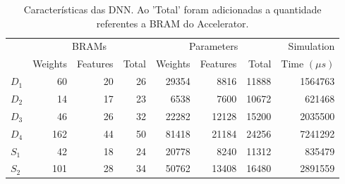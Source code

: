 \begin{table}[ht!]
\centering
\caption{Características das DNN. Ao 'Total' foram adicionadas a quantidade referentes a BRAM do Accelerator.}
\label{tab:5-dnn-report}
\begin{tabular}{lrrrrrrr}
\toprule
 & \multicolumn{3}{c}{BRAMs} & \multicolumn{3}{c}{Parameters} & Simulation \\
\cmidrule(r){2-4} \cmidrule(lr){5-7} \cmidrule(l){8-8}
 & Weights & Features & Total & Weights & Features & Total & Time $(\mu s)$ \\
\midrule
$D_1$ & 60 & 20 & 26 & 29354 & 8816 & 11888 & 1564763 \\
$D_2$ & 14 & 17 & 23 & 6538 & 7600 & 10672 & 621468 \\
$D_3$ & 46 & 26 & 32 & 22282 & 12128 & 15200 & 2035500 \\
$D_4$ & 162 & 44 & 50 & 81418 & 21184 & 24256 & 7241292 \\
$S_1$ & 42 & 18 & 24 & 20778 & 8240 & 11312 & 835479 \\
$S_2$ & 101 & 28 & 34 & 50762 & 13408 & 16480 & 2891559 \\
\bottomrule
\end{tabular}
\end{table}